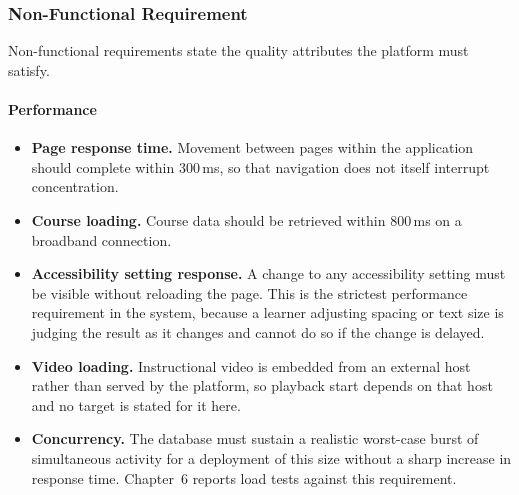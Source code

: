 \documentclass[12pt, oneside]{article} %
\begin{document}
\subsubsection{Non-Functional Requirement}
\label{sec:nfr}

Non-functional requirements state the quality attributes the platform must satisfy.

\paragraph{Performance}
\begin{itemize}
    \item \textbf{Page response time.} Movement between pages within the application should complete within 300\,ms, so that navigation does not itself interrupt concentration.
    \item \textbf{Course loading.} Course data should be retrieved within 800\,ms on a broadband connection.
    \item \textbf{Accessibility setting response.} A change to any accessibility setting must be visible without reloading the page. This is the strictest performance requirement in the system, because a learner adjusting spacing or text size is judging the result as it changes and cannot do so if the change is delayed.
    \item \textbf{Video loading.} Instructional video is embedded from an external host rather than served by the platform, so playback start depends on that host and no target is stated for it here.
    \item \textbf{Concurrency.} The database must sustain a realistic worst-case burst of simultaneous activity for a deployment of this size without a sharp increase in response time. Chapter~6 reports load tests against this requirement.
\end{itemize}
\end{document}
